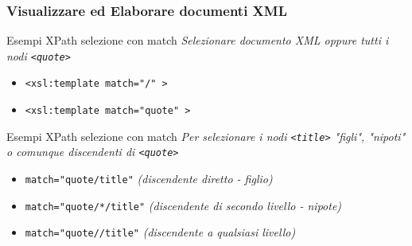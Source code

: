\begin{frame}
    \frametitle{Visualizzare ed Elaborare documenti XML}
    \addtocounter{nframe}{1}
    

    \begin{block}{Esempi XPath selezione con match}
        \emph{Selezionare \textit{documento XML} oppure tutti i nodi \texttt{<quote>}}
        \begin{itemize}
            \item \texttt{<xsl:template match="/" >}
            \item \texttt{<xsl:template match="quote" >}
        \end{itemize}
        
    \end{block}
     
    \begin{block}{Esempi XPath selezione con match}
        \emph{Per selezionare i nodi \texttt{<title>} "figli", "nipoti" o comunque discendenti di \texttt{<quote>}}
        \begin{itemize}
            \item \texttt{match="quote/title"} \textit{(discendente diretto - figlio)}
            \item \texttt{match="quote/*/title"} \textit{(discendente di secondo livello - nipote)}
            \item \texttt{match="quote//title"} \textit{(discendente a qualsiasi livello)}
        \end{itemize}     
    \end{block}
    
\end{frame}

